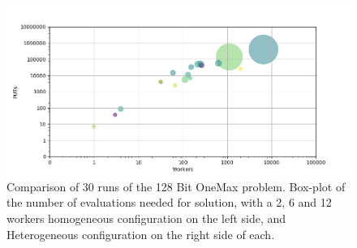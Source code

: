 \documentclass{llncs}
\begin{document}
\begin{figure}[t]
    \centering
        \includegraphics[width=5in]{img/workers_put_ip.png}
    \caption{Comparison of 30 runs of the 128 Bit OneMax problem. 
    Box-plot of the number of evaluations needed for solution, with a 2, 6 and 12 workers
    homogeneous configuration on the left side, and Heterogeneous configuration on the
    right side of each.
    }
    \label{fig:comp-onemax}
\end{figure}
\end{document}

